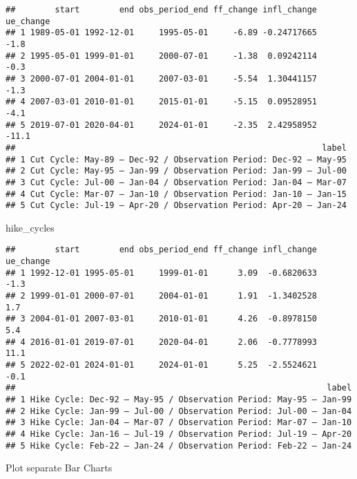 \documentclass[
]{article}
\newenvironment{Shaded}{\begin{snugshade}}{\end{snugshade}}
\newcommand{\NormalTok}[1]{#1}
\begin{document}
\begin{verbatim}
##        start        end obs_period_end ff_change infl_change ue_change
## 1 1989-05-01 1992-12-01     1995-05-01     -6.89 -0.24717665      -1.8
## 2 1995-05-01 1999-01-01     2000-07-01     -1.38  0.09242114      -0.3
## 3 2000-07-01 2004-01-01     2007-03-01     -5.54  1.30441157      -1.3
## 4 2007-03-01 2010-01-01     2015-01-01     -5.15  0.09528951      -4.1
## 5 2019-07-01 2020-04-01     2024-01-01     -2.35  2.42958952     -11.1
##                                                              label
## 1 Cut Cycle: May-89 – Dec-92 / Observation Period: Dec-92 – May-95
## 2 Cut Cycle: May-95 – Jan-99 / Observation Period: Jan-99 – Jul-00
## 3 Cut Cycle: Jul-00 – Jan-04 / Observation Period: Jan-04 – Mar-07
## 4 Cut Cycle: Mar-07 – Jan-10 / Observation Period: Jan-10 – Jan-15
## 5 Cut Cycle: Jul-19 – Apr-20 / Observation Period: Apr-20 – Jan-24
\end{verbatim}

\begin{Shaded}
\begin{Highlighting}[]
\NormalTok{hike\_cycles}
\end{Highlighting}
\end{Shaded}

\begin{verbatim}
##        start        end obs_period_end ff_change infl_change ue_change
## 1 1992-12-01 1995-05-01     1999-01-01      3.09  -0.6820633      -1.3
## 2 1999-01-01 2000-07-01     2004-01-01      1.91  -1.3402528       1.7
## 3 2004-01-01 2007-03-01     2010-01-01      4.26  -0.8978150       5.4
## 4 2016-01-01 2019-07-01     2020-04-01      2.06  -0.7778993      11.1
## 5 2022-02-01 2024-01-01     2024-01-01      5.25  -2.5524621      -0.1
##                                                               label
## 1 Hike Cycle: Dec-92 – May-95 / Observation Period: May-95 – Jan-99
## 2 Hike Cycle: Jan-99 – Jul-00 / Observation Period: Jul-00 – Jan-04
## 3 Hike Cycle: Jan-04 – Mar-07 / Observation Period: Mar-07 – Jan-10
## 4 Hike Cycle: Jan-16 – Jul-19 / Observation Period: Jul-19 – Apr-20
## 5 Hike Cycle: Feb-22 – Jan-24 / Observation Period: Feb-22 – Jan-24
\end{verbatim}

Plot separate Bar Charts
\end{document}
